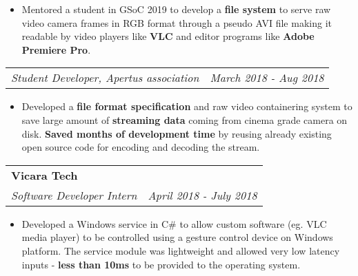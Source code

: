 \documentclass[a4paper,6pt]{article}
\begin{document}
\small
\begin{itemize}
	\itemsep0em
    \item Mentored a student in GSoC 2019 to develop a \textcolor{mygray}{\textbf{file system}} to serve raw video camera frames in RGB format through a pseudo AVI file making it readable by video players like \textcolor{mygray}{\textbf{VLC}} and editor programs like \textcolor{mygray}{\textbf{Adobe Premiere Pro}}.
\end{itemize}

\normalsize
\vspace{2px}
\hspace{5px}
\begin{tabularx}{\textwidth}{X r}
	\textit{\small Student Developer, Apertus association}& \textit{March 2018 - Aug 2018} \\
\end{tabularx}
\small
\begin{itemize}
	\itemsep0em
	\item Developed a \textcolor{mygray}{\textbf{file format specification}} and raw video containering system to save large amount of \textcolor{mygray}{\textbf{streaming data}} coming from cinema grade camera on disk. \textcolor{mygray}{\textbf{Saved months of development time}} by reusing already existing open source code for encoding and decoding the stream.
\end{itemize}
\normalsize

\vspace{6px}
\hspace{5px}
\begin{tabularx}{\textwidth}{X r}
	\large{\textbf{Vicara Tech}} & \\
	\textit{\small Software Developer Intern}& \textit{April 2018 - July 2018} \\
\end{tabularx}

\small
\begin{itemize}
	\itemsep0em
	\item Developed a Windows service in C\# to allow custom software (eg. VLC media player) to be controlled using a gesture control device on Windows platform. The service module was lightweight and allowed very low latency inputs - \textcolor{mygray}{\textbf{less than 10ms}} to be provided to the operating system.
\end{itemize}
\normalsize

\vspace{-9px}
\end{document}

